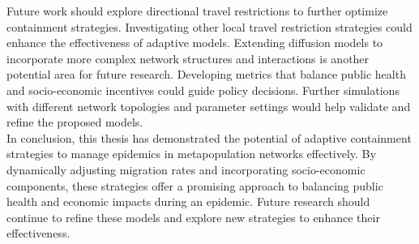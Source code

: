 Future work should explore directional travel restrictions to further optimize containment strategies. Investigating other local travel restriction strategies could enhance the effectiveness of adaptive models. Extending diffusion models to incorporate more complex network structures and interactions is another potential area for future research. Developing metrics that balance public health and socio-economic incentives could guide policy decisions. Further simulations with different network topologies and parameter settings would help validate and refine the proposed models.\\

In conclusion, this thesis has demonstrated the potential of adaptive containment strategies to manage epidemics in metapopulation networks effectively. By dynamically adjusting migration rates and incorporating socio-economic components, these strategies offer a promising approach to balancing public health and economic impacts during an epidemic. Future research should continue to refine these models and explore new strategies to enhance their effectiveness.